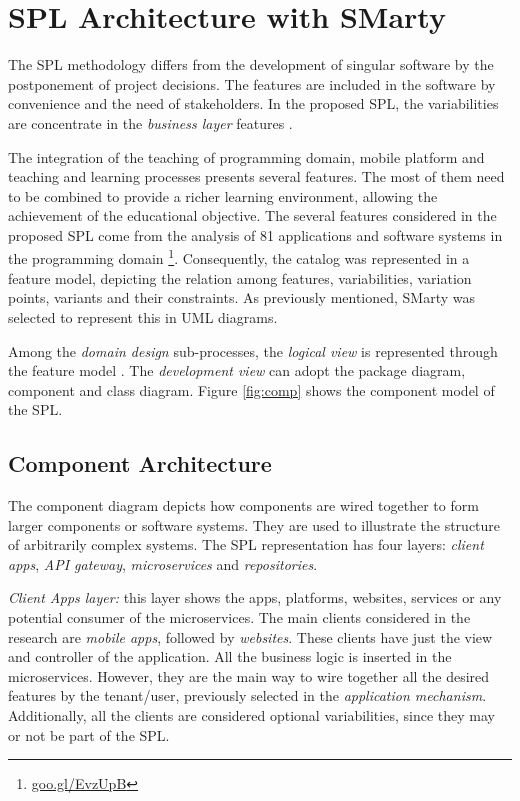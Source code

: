 

\section{SPL Architecture with SMarty}
\label{sec:spl_smarty}

The SPL methodology differs from the development of singular software by the postponement of project decisions. The features are included in the software by convenience and the need of stakeholders. In the proposed SPL, the variabilities are concentrate in the \textit{business layer} features \cite{marcolinoarcht2017}. 

The integration of the teaching of programming domain, mobile platform and teaching and learning processes presents several features. The most of them need to be combined to provide a richer learning environment, allowing the achievement of the educational objective. The several features considered in the proposed SPL come from the analysis of 81 applications and software systems in the programming domain \footnote{\url{goo.gl/EvzUpB}}. Consequently, the catalog was represented in a feature model, depicting the relation among features, variabilities, variation points, variants and their constraints. As previously mentioned, SMarty was selected to represent this in UML diagrams. 



Among the \textit{domain design} sub-processes, the \textit{logical view} is represented through the feature model \cite{LindenSchmidRommes07}. The \textit{development view} can adopt the package diagram, component and class diagram. Figure \ref{fig:comp} shows the component model of the SPL.  



\subsection{Component Architecture}

The component diagram depicts how components are wired together to form larger components or software systems. They are used to illustrate the structure of arbitrarily complex systems\cite{Pressman:2015}. The SPL representation has four layers: \textit{client apps}, \textit{API gateway}, \textit{microservices} and \textit{repositories}.

\textit{Client Apps layer:} this layer shows the apps, platforms, websites, services or any potential consumer of the microservices. The main clients considered in the research are \textit{mobile apps}, followed by \textit{websites}. These clients have just the view and controller of the application. All the business logic is inserted in the microservices. However, they are the main way to wire together all the desired features by the tenant/user, previously selected in the \textit{application mechanism}. Additionally, all the clients are considered optional variabilities, since they may or not be part of the SPL. 

